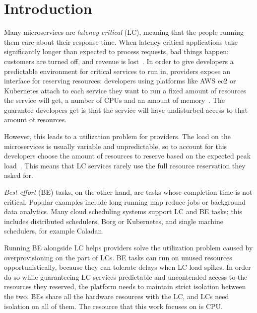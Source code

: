 \section{Introduction}
\label{s:intro}

Many microservices are \textit{latency critical} (LC), meaning that the people
running them care about their response time. When latency critical applications
take significantly longer than expected to process requests, bad things happen:
customers are turned off, and revenue is lost~\cite{google-speed-matters,
amz-speed-matters}. In order to give developers a predictable environment for
critical services to run in, providers expose an interface for reserving
resources: developers using platforms like AWS ec2 or Kubernetes attach to each
service they want to run a fixed amount of resources the service will get, \ie{}
a number of CPUs and an amount of memory~\cite{aws-ec2-resources,
kubernetes-resources}. The guarantee developers get is that the service will
have undisturbed access to that amount of resources.

However, this leads to a utilization problem for providers. The load on the
microservices is usually variable and unpredictable, so to account for this
developers choose the amount of resources to reserve based on the expected peak
load~\cite{borg, nu, overprovision}. This means that LC services rarely use the
full resource reservation they asked for.

\textit{Best effort} (BE) tasks, on the other hand, are tasks whose completion
time is not critical. Popular examples include long-running map reduce jobs or
background data analytics. Many cloud scheduling systems support LC and BE
tasks; this includes distributed schedulers, \eg{} Borg\cite{borg} or
Kubernetes\cite{kubernetes-resources}, and single machine schedulers, for
example Caladan\cite{caladan}.

Running BE alongside LC helps providers solve the utilization problem caused by
overprovisioning on the part of LCs. BE tasks can run on unused resources
opportunistically, because they can tolerate delays when LC load spikes. In
order do so while guaranteeing LC services predictable and uncontended access to
the resources they reserved, the platform needs to maintain strict isolation
between the two. BEs share all the hardware resources with the LC, and LCs need
isolation on all of them. The resource that this work focuses on is CPU.


